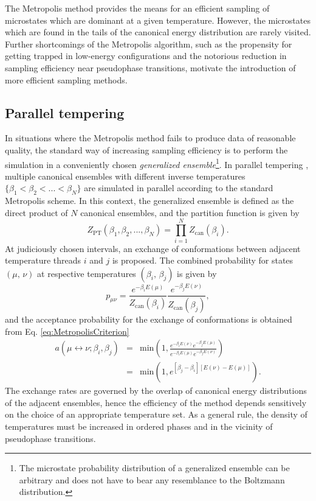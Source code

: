 \documentclass[12pt]{report}
\begin{document}
The Metropolis method provides the means for an efficient sampling of microstates which are dominant at a given temperature. However, the microstates which are found in the tails of the canonical energy distribution are rarely visited. Further shortcomings of the Metropolis algorithm, such as the propensity for getting trapped in low-energy configurations and the notorious reduction in sampling efficiency near pseudophase transitions, motivate the introduction of more efficient sampling methods.


\subsection{Parallel tempering}
\label{subsec:ParallelTempering}
In situations where the Metropolis method fails to produce data of reasonable quality, the standard way of increasing sampling efficiency is to perform the simulation in a conveniently chosen \textit{generalized ensemble}\footnote{The microstate probability distribution of a generalized ensemble can be arbitrary and does not have to bear any resemblance to the Boltzmann distribution.}. In parallel tempering \cite{sw1,geyer1,huku1,huku2}, multiple canonical ensembles with different inverse temperatures $\{\beta_{1} < \beta_{2} < ... < \beta_{N}\}$ are simulated in parallel according to the standard Metropolis scheme. In this context, the generalized ensemble is defined as the direct product of $N$ canonical ensembles, and the partition function is given by
%
\begin{equation}
Z_{\mathrm{PT}}(\beta_{1},\beta_{2},...,\beta_{N}) = \prod_{i=1}^{N} Z_{\mathrm{can}}(\beta_{i}).
\end{equation}
%
At judiciously chosen intervals, an exchange of conformations between adjacent temperature threads $i$ and $j$ is proposed. The combined probability for states $(\mu, \, \nu)$ at respective temperatures $(\beta_{i}, \, \beta_{j})$ is given by
\begin{equation}
p_{\mu\nu} =  \frac{\displaystyle e^{-\beta_{i}E(\mu)}}{\displaystyle Z_{\mathrm{can}}(\beta_{i})} \frac{\displaystyle e^{-\beta_{j}E(\nu)}}{\displaystyle Z_{\mathrm{can}}(\beta_{j})},
\end{equation}
%
and the acceptance probability for the exchange of conformations is obtained from Eq. \ref{eq:MetropolisCriterion}
%
\begin{eqnarray}
\label{eq:replicaExchange}
a\left(\mu \leftrightarrow \nu;\beta _{i}, \beta_{j} \right) &=&
\mathrm{min}\left(1, \frac{\displaystyle e^{-\beta_{i}E(\nu)}e^{-\beta_{j}E(\mu)}}{\displaystyle e^{-\beta_{i}E(\mu)}e^{-\beta_{j}E(\nu)}}\right) \nonumber \\
&=&
\mathrm{min}\left(1,e^{\left[\beta_{j} -
\beta _{i} \right] \left[E (\nu) -
E(\mu)\right]} \right).
\end{eqnarray}
%
The exchange rates are governed by the overlap of canonical energy distributions of the adjacent ensembles, hence the efficiency of the method depends sensitively on the choice of an appropriate temperature set. As a general rule, the density of temperatures must be increased in ordered phases and in the vicinity of pseudophase transitions. 
\end{document}
